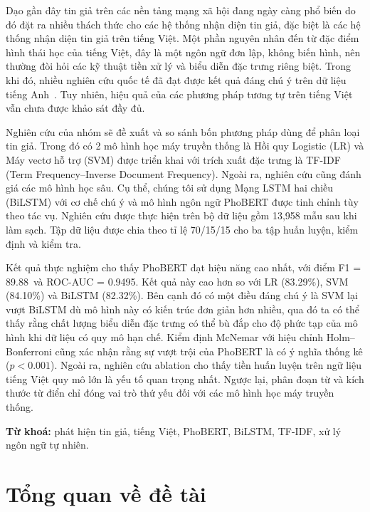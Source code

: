\documentclass[12pt, a4paper]{report}
\newcommand{\nClean}{13,958}             %
\newcommand{\phobertFone}{89.88}
\newcommand{\phobertAUC}{0.9495}
\newcommand{\lrFone}{83.29}
\newcommand{\svmFone}{84.10}
\newcommand{\bilstmFone}{82.32}
\newcommand{\splitRatio}{70/15/15}
\begin{document}
Dạo gần đây tin giả trên các nền tảng mạng xã hội đang ngày càng phổ biến do đó đặt ra nhiều thách thức cho các hệ thống nhận diện tin giả, đặc biệt là các hệ thống nhận diện tin giả trên tiếng Việt. Một phần nguyên nhân đến từ đặc điểm hình thái học của tiếng Việt, đây là một ngôn ngữ đơn lập, không biến hình, nên thường đòi hỏi các kỹ thuật tiền xử lý và biểu diễn đặc trưng riêng biệt. Trong khi đó, nhiều nghiên cứu quốc tế đã đạt được kết quả đáng chú ý trên dữ liệu tiếng Anh~\cite{shu2017fakenews}. Tuy nhiên, hiệu quả của các phương pháp tương tự trên tiếng Việt vẫn chưa được khảo sát đầy đủ.

Nghiên cứu của nhóm sẽ đề xuất và so sánh bốn phương pháp dùng để phân loại tin giả. Trong đó có 2 mô hình học máy truyền thống là Hồi quy Logistic (LR) và Máy vectơ hỗ trợ (SVM) được triển khai với trích xuất đặc trưng là TF-IDF (Term Frequency–Inverse Document Frequency). Ngoài ra, nghiên cứu cũng đánh giá các mô hình học sâu. Cụ thể, chúng tôi sử dụng Mạng LSTM hai chiều (BiLSTM) với cơ chế chú ý và mô hình ngôn ngữ PhoBERT được tinh chỉnh tùy theo tác vụ. Nghiên cứu được thực hiện trên bộ dữ liệu gồm \nClean{} mẫu sau khi làm sạch. Tập dữ liệu được chia theo tỉ lệ \splitRatio{} cho ba tập huấn luyện, kiểm định và kiểm tra.

Kết quả thực nghiệm cho thấy PhoBERT đạt hiệu năng cao nhất, với điểm F1 = \phobertFone\ và ROC-AUC = \phobertAUC. Kết quả này cao hơn so với LR (\lrFone\%), SVM (\svmFone\%) và BiLSTM (\bilstmFone\%). Bên cạnh đó có một điều đáng chú ý là SVM lại vượt BiLSTM dù mô hình này có kiến trúc đơn giản hơn nhiều, qua đó ta có thể thấy rằng chất lượng biểu diễn đặc trưng có thể bù đắp cho độ phức tạp của mô hình khi dữ liệu có quy mô hạn chế. Kiểm định McNemar với hiệu chỉnh Holm–Bonferroni cũng xác nhận rằng sự vượt trội của PhoBERT là có ý nghĩa thống kê ($p < 0.001$). Ngoài ra, nghiên cứu ablation cho thấy tiền huấn luyện trên ngữ liệu tiếng Việt quy mô lớn là yếu tố quan trọng nhất. Ngược lại, phân đoạn từ và kích thước từ điển chỉ đóng vai trò thứ yếu đối với các mô hình học máy truyền thống.

\bigskip
\noindent\textbf{Từ khoá:} phát hiện tin giả, tiếng Việt, PhoBERT, BiLSTM, TF-IDF, xử lý ngôn ngữ tự nhiên.
\newpage


\chapter*{Tổng quan về đề tài}
\label{introduction}
\end{document}
